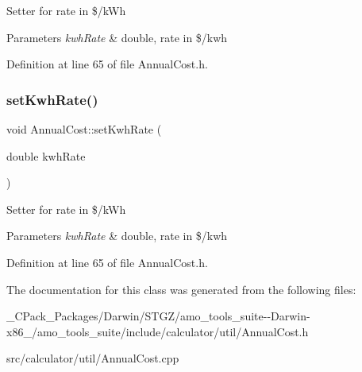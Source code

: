 Setter for rate in \$/k\+Wh 
\begin{DoxyParams}{Parameters}
{\em kwh\+Rate} & double, rate in \$/kwh \\
\hline
\end{DoxyParams}


Definition at line 65 of file Annual\+Cost.\+h.

\mbox{\label{class_annual_cost_a45a1259c9912c7202dff446c290210e9}} 
\subsubsection{\texorpdfstring{set\+Kwh\+Rate()}{setKwhRate()}\hspace{0.1cm}{\footnotesize\ttfamily [3/3]}}
{\footnotesize\ttfamily void Annual\+Cost\+::set\+Kwh\+Rate (\begin{DoxyParamCaption}\item[{double}]{kwh\+Rate }\end{DoxyParamCaption})\hspace{0.3cm}{\ttfamily [inline]}}

Setter for rate in \$/k\+Wh 
\begin{DoxyParams}{Parameters}
{\em kwh\+Rate} & double, rate in \$/kwh \\
\hline
\end{DoxyParams}


Definition at line 65 of file Annual\+Cost.\+h.



The documentation for this class was generated from the following files\+:\begin{DoxyCompactItemize}
\item 
\+\_\+\+C\+Pack\+\_\+\+Packages/\+Darwin/\+S\+T\+G\+Z/amo\+\_\+tools\+\_\+suite-\/-\/\+Darwin-\/x86\+\_/amo\+\_\+tools\+\_\+suite/include/calculator/util/Annual\+Cost.\+h\item 
src/calculator/util/Annual\+Cost.\+cpp\end{DoxyCompactItemize}
